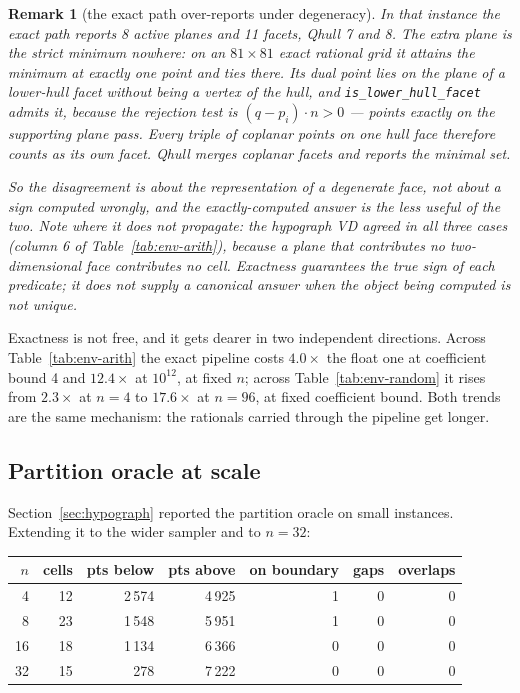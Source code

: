 \documentclass[11pt]{article}
\newtheorem{remark}{Remark}
\begin{document}
\begin{remark}[the exact path over-reports under degeneracy]
\label{rem:degenerate-facets}
In that instance the exact path reports 8 active planes and 11 facets, Qhull 7
and 8.  The extra plane is the strict minimum nowhere: on an $81 \times 81$
exact rational grid it attains the minimum at exactly one point and ties there.
Its dual point lies \emph{on} the plane of a lower-hull facet without being a
vertex of the hull, and \texttt{is\_lower\_hull\_facet} admits it, because the
rejection test is $(q - p_i) \cdot n > 0$ --- points exactly on the supporting
plane pass.  Every triple of coplanar points on one hull face therefore counts
as its own facet.  Qhull merges coplanar facets and reports the minimal set.

So the disagreement is about the representation of a degenerate face, not about
a sign computed wrongly, and the exactly-computed answer is the less useful of
the two.  Note where it does \emph{not} propagate: the hypograph VD agreed in
all three cases (column 6 of Table~\ref{tab:env-arith}), because a plane that
contributes no two-dimensional face contributes no cell.  Exactness guarantees
the true sign of each predicate; it does not supply a canonical answer when the
object being computed is not unique.
\end{remark}

Exactness is not free, and it gets dearer in two independent directions.  Across
Table~\ref{tab:env-arith} the exact pipeline costs $4.0\times$ the float one at
coefficient bound 4 and $12.4\times$ at $10^{12}$, at fixed $n$; across
Table~\ref{tab:env-random} it rises from $2.3\times$ at $n = 4$ to $17.6\times$
at $n = 96$, at fixed coefficient bound.  Both trends are the same mechanism:
the rationals carried through the pipeline get longer.



\subsection{Partition oracle at scale}
\label{sec:bench-oracle}

Section~\ref{sec:hypograph} reported the partition oracle on small instances.
Extending it to the wider sampler and to $n = 32$:

\begin{center}
\begin{tabular}{rrrrrrr}
\toprule
$n$ & cells & pts below & pts above & on boundary & gaps & overlaps \\
\midrule
4  & 12 & 2\,574 & 4\,925 & 1 & 0 & 0 \\
8  & 23 & 1\,548 & 5\,951 & 1 & 0 & 0 \\
16 & 18 & 1\,134 & 6\,366 & 0 & 0 & 0 \\
32 & 15 &   278  & 7\,222 & 0 & 0 & 0 \\
\bottomrule
\end{tabular}
\end{center}
\end{document}
